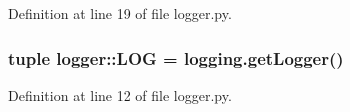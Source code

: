 \-Definition at line 19 of file logger.\-py.

\hypertarget{namespacelogger_a2f9689ec77ef8266c1a4178030902381}{
\subsubsection[{\-L\-O\-G}]{\setlength{\rightskip}{0pt plus 5cm}tuple {\bf logger\-::\-L\-O\-G} = logging.\-get\-Logger()}}
\label{namespacelogger_a2f9689ec77ef8266c1a4178030902381}


\-Definition at line 12 of file logger.\-py.

